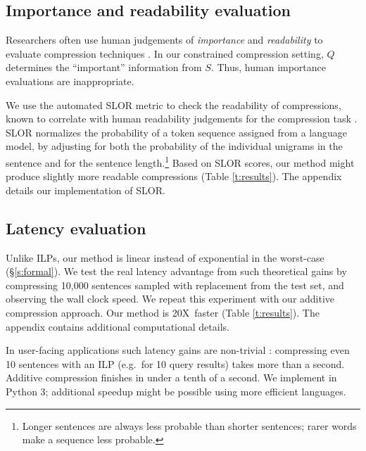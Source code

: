 \documentclass[11pt,a4paper]{article}
\newcommand{\speedup}[0]{20X~}
\begin{document}
\subsection{Importance and readability evaluation}\label{s:readabilityinformativeness}

Researchers often use human judgements of \textit{importance} and \textit{readability} to evaluate compression techniques \cite{Knight2000StatisticsBasedS,clarke2008global,filippova2015sentence}. In our constrained compression setting, $Q$ determines the ``important'' information from $S$. Thus, human importance evaluations are inappropriate.

We use the automated SLOR metric \cite{lau2015unsupervised} to check the readability of compressions, known to correlate with human readability judgements for the compression task \cite{kannConl}. SLOR normalizes the probability of a token sequence assigned from a language model, by adjusting for both the probability of the individual unigrams in the sentence and for the sentence length.\footnote{Longer sentences are always less probable than shorter sentences; rarer words make a sequence less probable.} Based on SLOR scores, our method might produce slightly more readable compressions (Table \ref{t:results}). The appendix details our implementation of SLOR. 

\subsection{Latency evaluation}\label{s:costs}

Unlike ILPs, our method is linear instead of exponential in the worst-case (\S\ref{s:formal}). We test the real latency advantage from such theoretical gains by compressing 10,000 sentences sampled with replacement from the test set, and observing the wall clock speed. We repeat this experiment with our additive compression approach. Our method is \speedup faster (Table \ref{t:results}). The appendix contains additional computational details.

In user-facing applications such latency gains are non-trivial \cite{Nielsen,heerschei,Liu2014TheEO}: compressing even 10 sentences with an ILP (e.g.\ for 10 query results) takes more than a second. Additive compression finishes in under a tenth of a second. We implement in Python 3; additional speedup might be possible using more efficient languages. 
\end{document}
